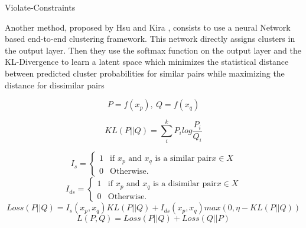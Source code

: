 \begin{algorithm}[!h]
  \caption{Violate-Constraints}
\end{algorithm}
Another method, proposed by Hsu and Kira \cite{2015arXiv151106321H}, consists to 
use a neural Network based end-to-end clustering framework. This network 
directly assigns clusters in the output layer. Then they use the softmax 
function on the output layer and the KL-Divergence to learn a latent space 
which minimizes the statistical distance between predicted cluster probabilities 
for similar pairs while maximizing the distance for dissimilar pairs

\begin{equation*}
  P = f(x_p), ~ Q = f(x_q)
\end{equation*}

\begin{equation*}
  KL(P||Q) = \sum_i^k P_ilog\frac{P_i}{Q_i}
\end{equation*}

\begin{equation*}
  I_s = \left\{
\begin{array}{ll}
  1 & \mbox{if $x_p$ and $x_q$ is a similar pair} x \in X\\
  0 & \mbox{Otherwise.}
\end{array}
\right.
\end{equation*}
%
\begin{equation*}
  I_{ds} = \left\{
\begin{array}{ll}
  1 & \mbox{if $x_p$ and $x_q$ is a disimilar pair} x \in X\\
  0 & \mbox{Otherwise.}
\end{array}
\right.
\end{equation*}
\begin{equation*}
  Loss(P || Q) = I_s(x_p, x_q)KL(P || Q) + I_{ds}(x_p, x_q)max(0, \eta-KL(P||Q))
\end{equation*}
\begin{equation*}
  L(P,Q) = Loss(P || Q) + Loss(Q || P)
\end{equation*}
